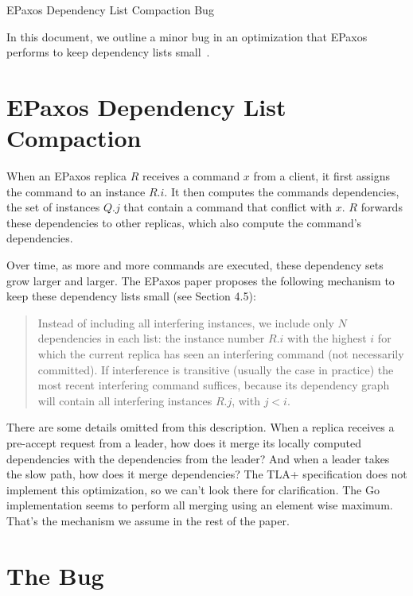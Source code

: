 \documentclass{mwhittaker}
\begin{document}
\begin{center}
  \Huge EPaxos Dependency List Compaction Bug
\end{center}
In this document, we outline a minor bug in an optimization that EPaxos
performs to keep dependency lists small~\cite{moraru2013there,
moraru2013proof}.

\section{EPaxos Dependency List Compaction}
When an EPaxos replica $R$ receives a command $x$ from a client, it first
assigns the command to an instance $R.i$. It then computes the commands
dependencies, the set of instances $Q.j$ that contain a command that conflict
with $x$. $R$ forwards these dependencies to other replicas, which also compute
the command's dependencies.

Over time, as more and more commands are executed, these dependency sets grow
larger and larger. The EPaxos paper proposes the following mechanism to keep
these dependency lists small (see Section 4.5):

\begin{quote}
  Instead of including all interfering instances, we include only $N$
  dependencies in each list: the instance number $R.i$ with the highest $i$ for
  which the current replica has seen an interfering command (not necessarily
  committed). If interference is transitive (usually the case in practice) the
  most recent interfering command suffices, because its dependency graph will
  contain all interfering instances $R.j$, with $j < i$.
\end{quote}

There are some details omitted from this description. When a replica receives a
pre-accept request from a leader, how does it merge its locally computed
dependencies with the dependencies from the leader? And when a leader takes the
slow path, how does it merge dependencies? The TLA+ specification does not
implement this optimization, so we can't look there for clarification. The Go
implementation seems to perform all merging using an element wise maximum.
That's the mechanism we assume in the rest of the paper.

\section{The Bug}
\newcommand{\preaccepted}{\textbf{pre}}
\newcommand{\accepted}{\textbf{acc}}
\newcommand{\committed}{\textbf{comm}}
\newcommand{\noop}{\bot}
\end{document}
